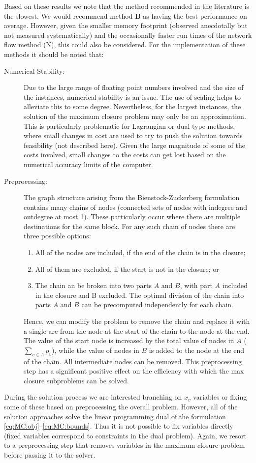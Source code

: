 \documentclass[authoryear,11pt,square,number,times,super,comma]{elsarticle}
\begin{document}
Based on these results we note that the method recommended in the literature is the slowest. We would recommend method {\bf B} as having the best performance on average. However, given the smaller memory footprint (observed anecdotally but not measured systematically) and the occasionally faster run times of the network flow method (N), this could also be considered. For the implementation of these methods it should be noted that:
\begin{description}
\item[Numerical Stability:] Due to the large range of floating point numbers
  involved and the size of the instances, numerical stability is an issue. The
  use of scaling helps to alleviate this to some degree. Nevertheless, for the
  largest instances, the solution of the maximum closure problem may only be an
  approximation. This is particularly problematic for Lagrangian or dual type
  methods, where small changes in cost are used to try to push the solution
  towards feasibility (not described here). Given the large magnitude of some
  of the costs involved, small changes to the costs can get lost based on the
  numerical accuracy limits of the computer.
\item[Preprocessing:] The graph structure arising from the
  Bienstock-Zuckerberg formulation contains many chains of nodes (connected
  sets of nodes with indegree and outdegree at most 1). These particularly
  occur where there are multiple destinations for the same block. For any
  such chain of nodes there are three possible options:
  \begin{enumerate}
  \item All of the nodes are included, if the end of the
    chain is in the closure;
  \item All of them are excluded, if the start is not in the
    closure; or
  \item The chain an be broken into two parts $A$ and $B$, with part $A$ included in
    the closure and B excluded. The optimal division of the chain into parts $A$
    and $B$ can be precomputed independently for each chain.
  \end{enumerate}
  Hence, we can modify the problem to remove the chain and replace it with  a
  single arc from the node at the start of the chain to the node at the end.
  The value of the start node is increased by the total value of nodes in $A$
  ($\sum_{v\in A} p_v$),  while the value of nodes in $B$ is added to the node
  at the end of the chain. All intermediate nodes can be removed.
  This preprocessing step has a significant positive
  effect on the efficiency with which the max closure subproblems can be
  solved. 
\end{description}
During the solution process we are interested branching on $x_v$ variables or fixing some of these based on preprocessing the overall problem. 
However, all of the solution approaches solve the linear programming dual of the formulation \eqref{eq:MC:obj}--\eqref{eq:MC:bounds}. Thus it is not possible 
to fix variables directly (fixed variables correspond to constraints in the dual problem). Again, we resort to a preprocessing step that removes variables in 
the maximum closure problem before passing it to the solver. 
\end{document}
